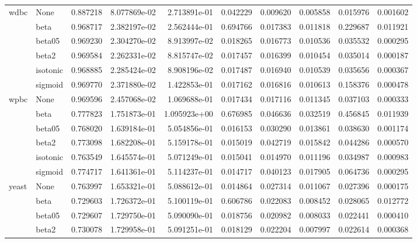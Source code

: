 \begin{tabular}{llrrrrrrrr}
wdbc & None &  0.887218 &  8.077869e-02 &  2.713891e-01 &   0.042229 &  0.009620 &  0.005858 &  0.015976 &  0.001602 \\
        & beta &  0.968717 &  2.382197e-02 &  2.562444e-01 &   0.694766 &  0.017383 &  0.011818 &  0.229687 &  0.011921 \\
        & beta05 &  0.969230 &  2.304270e-02 &  8.913997e-02 &   0.018265 &  0.016773 &  0.010536 &  0.035532 &  0.000295 \\
        & beta2 &  0.969584 &  2.262331e-02 &  8.815747e-02 &   0.017457 &  0.016399 &  0.010454 &  0.035014 &  0.000187 \\
        & isotonic &  0.968885 &  2.285424e-02 &  8.908196e-02 &   0.017487 &  0.016940 &  0.010539 &  0.035656 &  0.000367 \\
        & sigmoid &  0.969770 &  2.371880e-02 &  1.422853e-01 &   0.017162 &  0.016816 &  0.010613 &  0.158376 &  0.000478 \\
wpbc & None &  0.969596 &  2.457068e-02 &  1.069688e-01 &   0.017434 &  0.017116 &  0.011345 &  0.037103 &  0.000333 \\
        & beta &  0.777823 &  1.751873e-01 &  1.095923e+00 &   0.676985 &  0.046636 &  0.032519 &  0.456845 &  0.011939 \\
        & beta05 &  0.768020 &  1.639184e-01 &  5.054856e-01 &   0.016153 &  0.030290 &  0.013861 &  0.038630 &  0.001174 \\
        & beta2 &  0.773098 &  1.682208e-01 &  5.159178e-01 &   0.015019 &  0.042719 &  0.015842 &  0.044286 &  0.000570 \\
        & isotonic &  0.763549 &  1.645574e-01 &  5.071249e-01 &   0.015041 &  0.014970 &  0.011196 &  0.034987 &  0.000983 \\
        & sigmoid &  0.774717 &  1.641361e-01 &  5.114237e-01 &   0.014717 &  0.040123 &  0.017905 &  0.064736 &  0.000295 \\
yeast & None &  0.763997 &  1.653321e-01 &  5.088612e-01 &   0.014864 &  0.027314 &  0.011067 &  0.027396 &  0.000175 \\
        & beta &  0.729603 &  1.726372e-01 &  5.100119e-01 &   0.606786 &  0.022083 &  0.008452 &  0.028065 &  0.012772 \\
        & beta05 &  0.729607 &  1.729750e-01 &  5.090090e-01 &   0.018756 &  0.020982 &  0.008033 &  0.022441 &  0.000410 \\
        & beta2 &  0.730078 &  1.729958e-01 &  5.091251e-01 &   0.018129 &  0.022204 &  0.007997 &  0.022614 &  0.000368 \\

\end{tabular}
